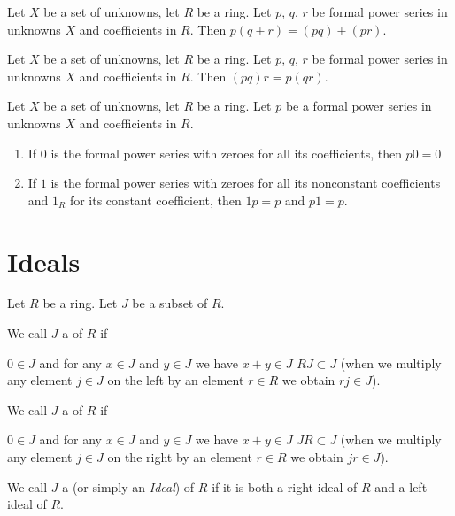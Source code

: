 \begin{theorem}
Let $X$ be a set of unknowns, let $R$ be a ring. Let $p$, $q$, $r$ be
formal power series in unknowns $X$ and coefficients in $R$. Then
$p(q+r)=(pq) + (pr)$.
\end{theorem}

\begin{theorem}
Let $X$ be a set of unknowns, let $R$ be a ring. Let $p$, $q$, $r$ be
formal power series in unknowns $X$ and coefficients in $R$. Then
$(pq)r=p(qr)$.
\end{theorem}

\begin{theorem}
Let $X$ be a set of unknowns, let $R$ be a ring. Let $p$ be a
formal power series in unknowns $X$ and coefficients in $R$. 
\begin{enumerate}
\item If $0$ is the formal power series with zeroes for all its
  coefficients, then $p0=0$
\item If $1$ is the formal power series with zeroes for all its
  nonconstant coefficients and $1_{R}$ for its constant coefficient,
  then $1p=p$ and $p1=p$.
\end{enumerate}
\end{theorem}

\section{Ideals}

\begin{definition}
Let $R$ be a ring. Let $J$ be a subset of $R$.

We call $J$ a  of $R$ if
\begin{itemize}
 $0\in J$ and
 for any $x\in J$ and $y\in J$ we have
  $x+y\in J$
 $RJ\subset J$ (when we multiply any
element $j\in J$ on the left by an element $r\in R$ we obtain $rj\in J$).
\end{itemize}

\noindent%
We call $J$ a  of $R$ if
\begin{itemize}
 $0\in J$ and
 for any $x\in J$ and $y\in J$ we have
  $x+y\in J$
 $JR\subset J$ (when we
  multiply any element $j\in J$ on the right by an element $r\in R$ we obtain $jr\in J$).
\end{itemize}

\noindent%
We call $J$ a  (or simply an \emph{Ideal}) of
$R$ if it is both a right ideal of $R$ and a left ideal of $R$.
\end{definition}

